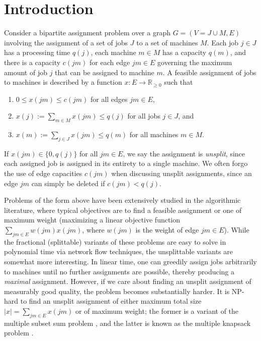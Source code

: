 \documentclass{llncs}
\begin{document}
\section{Introduction}
Consider a bipartite assignment problem over a graph $G = (V = J \cup
M, E)$ involving the assignment of a set of jobs $J$ to a set of
machines $M$. Each job $j \in J$ has a processing time $q(j)$, 
each machine $m \in M$ has a capacity $q(m)$, and there is a capacity
$c(jm)$ for each edge $jm \in E$ governing the maximum amount of job
$j$ that can be assigned to machine $m$.  A feasible assignment of
jobs to machines is described by a function $x : E \rightarrow
\mathbb{R}_{\geq 0}$ such that 
\begin{enumerate}
\item $0 \leq x(jm) \leq c(jm)$ for all edges $jm \in E$,
\item $x(j) := \sum_{m \in M} {x(jm)} \leq q(j)$ for all jobs $j \in J$, and
\item $x(m) := \sum_{j \in J} {x(jm)} \leq q(m)$ for all machines $m \in M$.
\end{enumerate}
If $x(jm) \in \{0, q(j)\}$ for all $jm \in E$, we say the assignment
is \emph{unsplit}, since each assigned job is assigned in its entirety
to a single machine. We often forgo the use of edge capacities $c(jm)$
when discussing unsplit assignments, since an edge $jm$ can simply be
deleted if $c(jm) < q(j)$.

Problems of the form above have been extensively studied in the
algorithmic literature, where typical objectives are to find a
feasible assignment or one of maximum weight (maximizing a linear
objective function $\sum_{jm \in E} w(jm) x(jm)$, where $w(jm)$ is the
weight of edge $jm \in E$).  While the fractional (splittable)
variants of these problems are easy to solve in polynomial time via
network flow techniques, the unsplittable variants are somewhat more
interesting.  In linear time, one can greedily assign jobs arbitrarily
to machines until no further assignments are possible, thereby
producing a {\em maximal} assignment.  However, if we care about
finding an unsplit assignment of measurably good quality, the problem
becomes substantially harder.  It is NP-hard to find an unsplit
assignment of either maximum total size $|x| = \sum_{jm \in E} x(jm)$
or of maximum weight; the former is a variant of the multiple subset
sum problem \cite{Caprara2000111}, and the latter is known as the
multiple knapsack problem \cite{DBLP:journals/siamcomp/ChekuriK05}.
\end{document}

